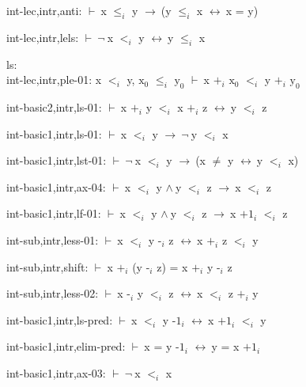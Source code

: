 \documentclass[a4paper]{article}
\newcommand{\Fol}{\mbox{$\vdash\ $}}
\newcommand{\Not}{\mbox{$\neg\ $}}
\newcommand{\And}{\mbox{$\wedge\ $}}
\newcommand{\Imp}{\mbox{$\rightarrow\ $}}
\newcommand{\Equiv}{\mbox{$\leftrightarrow\ $}}
\begin{document}
int-lec,intr,anti: 
 \Fol x $\mbox{$\le$}_{i}$ y \Imp (y $\mbox{$\le$}_{i}$ x \Equiv x = y)



int-lec,intr,lels: 
 \Fol \Not x $\mbox{$<$}_{i}$ y \Equiv y $\mbox{$\le$}_{i}$ x



\bigskip

ls:\\ int-lec,intr,ple-01: 
x $\mbox{$<$}_{i}$ y, 
$\mbox{x}_{0}$ $\mbox{$\le$}_{i}$ $\mbox{y}_{0}$
 \Fol x $\mbox{+}_{i}$ $\mbox{x}_{0}$ $\mbox{$<$}_{i}$ y $\mbox{+}_{i}$ $\mbox{y}_{0}$

int-basic2,intr,ls-01: 
 \Fol x $\mbox{+}_{i}$ y $\mbox{$<$}_{i}$ x $\mbox{+}_{i}$ z \Equiv y $\mbox{$<$}_{i}$ z



int-basic1,intr,ls-01: 
 \Fol x $\mbox{$<$}_{i}$ y \Imp \Not y $\mbox{$<$}_{i}$ x



int-basic1,intr,lst-01: 
 \Fol \Not x $\mbox{$<$}_{i}$ y \Imp (x $\neq$ y \Equiv y $\mbox{$<$}_{i}$ x)



int-basic1,intr,ax-04: 
 \Fol x $\mbox{$<$}_{i}$ y \And y $\mbox{$<$}_{i}$ z \Imp x $\mbox{$<$}_{i}$ z



int-basic1,intr,lf-01: 
 \Fol x $\mbox{$<$}_{i}$ y \And y $\mbox{$<$}_{i}$ z \Imp x $\mbox{+1}_{i}$ $\mbox{$<$}_{i}$ z



int-sub,intr,less-01: 
 \Fol x $\mbox{$<$}_{i}$ y $\mbox{-}_{i}$ z \Equiv x $\mbox{+}_{i}$ z $\mbox{$<$}_{i}$ y



int-sub,intr,shift: 
 \Fol x $\mbox{+}_{i}$ (y $\mbox{-}_{i}$ z) = x $\mbox{+}_{i}$ y $\mbox{-}_{i}$ z



int-sub,intr,less-02: 
 \Fol x $\mbox{-}_{i}$ y $\mbox{$<$}_{i}$ z \Equiv x $\mbox{$<$}_{i}$ z $\mbox{+}_{i}$ y



int-basic1,intr,ls-pred: 
 \Fol x $\mbox{$<$}_{i}$ y $\mbox{-1}_{i}$ \Equiv x $\mbox{+1}_{i}$ $\mbox{$<$}_{i}$ y



int-basic1,intr,elim-pred: 
 \Fol x = y $\mbox{-1}_{i}$ \Equiv y = x $\mbox{+1}_{i}$



int-basic1,intr,ax-03: 
 \Fol \Not x $\mbox{$<$}_{i}$ x
\end{document}
